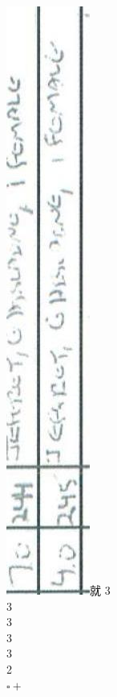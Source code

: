 \documentclass[10pt]{article}
\begin{document}
\includegraphics[max width=\textwidth]{2025_02_27_dd68c3d38de88f0516d9g-019(5)}就 3\\
3\\
3\\
3\\
3\\
2\\
\(\square+\)
\end{document}

